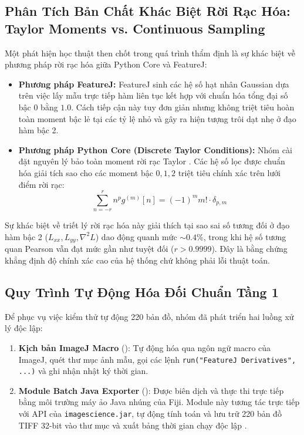 \documentclass[conference]{IEEEtran}
\begin{document}
\subsection{Phân Tích Bản Chất Khác Biệt Rời Rạc Hóa: Taylor Moments vs. Continuous Sampling}
Một phát hiện học thuật then chốt trong quá trình thẩm định là sự khác biệt về phương pháp rời rạc hóa giữa Python Core và FeatureJ:
\begin{itemize}
    \item \textbf{Phương pháp FeatureJ:} FeatureJ sinh các hệ số hạt nhân Gaussian dựa trên việc lấy mẫu trực tiếp hàm liên tục kết hợp với chuẩn hóa tổng đại số bậc 0 bằng $1.0$. Cách tiếp cận này tuy đơn giản nhưng không triệt tiêu hoàn toàn moment bậc lẻ tại các tỷ lệ nhỏ và gây ra hiện tượng trôi dạt nhẹ ở đạo hàm bậc 2.
    \item \textbf{Phương pháp Python Core (Discrete Taylor Conditions):} Nhóm cài đặt nguyên lý bảo toàn moment rời rạc Taylor \cite{meijering2004design}. Các hệ số lọc được chuẩn hóa giải tích sao cho các moment bậc $0, 1, 2$ triệt tiêu chính xác trên lưới điểm rời rạc:
    \begin{equation}
    \sum_{n=-r}^r n^p g^{(m)}[n] = (-1)^m m! \cdot \delta_{p, m}
    \end{equation}
\end{itemize}
Sự khác biệt về triết lý rời rạc hóa này giải thích tại sao sai số tương đối ở đạo hàm bậc 2 ($L_{xx}, L_{yy}, \nabla^2 L$) dao động quanh mức $\sim 0.4\%$, trong khi hệ số tương quan Pearson vẫn đạt mức gần như tuyệt đối ($r > 0.9999$). Đây là bằng chứng khẳng định độ chính xác cao của hệ thống chứ không phải lỗi thuật toán.

\subsection{Quy Trình Tự Động Hóa Đối Chuẩn Tầng 1}
Để phục vụ việc kiểm thử tự động 220 bản đồ, nhóm đã phát triển hai luồng xử lý độc lập:
\begin{enumerate}
    \item \textbf{Kịch bản ImageJ Macro} (): Tự động hóa qua ngôn ngữ macro của ImageJ, quét thư mục ảnh mẫu, gọi các lệnh \texttt{run("FeatureJ Derivatives", ...)} và ghi nhận nhật ký thời gian.
    \item \textbf{Module Batch Java Exporter} (): Được biên dịch và thực thi trực tiếp bằng môi trường máy ảo Java nhúng của Fiji. Module này tương tác trực tiếp với API của \texttt{imagescience.jar}, tự động tính toán và lưu trữ 220 bản đồ TIFF 32-bit vào thư mục  và xuất bảng thời gian chạy độc lập .
\end{enumerate}
\end{document}
